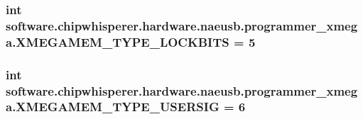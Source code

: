 \subsubsection[{X\+M\+E\+G\+A\+M\+E\+M\+\_\+\+T\+Y\+P\+E\+\_\+\+L\+O\+C\+K\+B\+I\+T\+S}]{\setlength{\rightskip}{0pt plus 5cm}int software.\+chipwhisperer.\+hardware.\+naeusb.\+programmer\+\_\+xmega.\+X\+M\+E\+G\+A\+M\+E\+M\+\_\+\+T\+Y\+P\+E\+\_\+\+L\+O\+C\+K\+B\+I\+T\+S = 5}\label{namespacesoftware_1_1chipwhisperer_1_1hardware_1_1naeusb_1_1programmer__xmega_aff20d6cf39708822b4321e223ab6a9fd}
\hypertarget{namespacesoftware_1_1chipwhisperer_1_1hardware_1_1naeusb_1_1programmer__xmega_aab73401478df0572d05bdceacfccfee1}{}
\subsubsection[{X\+M\+E\+G\+A\+M\+E\+M\+\_\+\+T\+Y\+P\+E\+\_\+\+U\+S\+E\+R\+S\+I\+G}]{\setlength{\rightskip}{0pt plus 5cm}int software.\+chipwhisperer.\+hardware.\+naeusb.\+programmer\+\_\+xmega.\+X\+M\+E\+G\+A\+M\+E\+M\+\_\+\+T\+Y\+P\+E\+\_\+\+U\+S\+E\+R\+S\+I\+G = 6}\label{namespacesoftware_1_1chipwhisperer_1_1hardware_1_1naeusb_1_1programmer__xmega_aab73401478df0572d05bdceacfccfee1}
